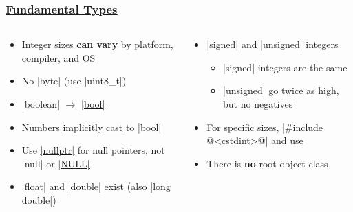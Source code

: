 \documentclass[glossy]{beamer}
\newcommand{\cppref}[2]{\href{http://en.cppreference.com/w/cpp/#1}{\underline{#2}}}
\begin{document}

\begin{frame}[fragile=singleslide]
  \frametitle{\cppref{language/types}{Fundamental Types}}
  \begin{columns}[t]
    \begin{column}{6cm}
      \begin{itemize}
        \item Integer sizes \cppref{language/types\#Data_models}{\textbf{can vary}} by platform, compiler, and OS
        \item No \javainline|byte| (use \cppinline|uint8_t|)
        \item \javainline|boolean| $\rightarrow$ \cppref{language/types\#Boolean_type}{\cppinline|bool|}
        \item Numbers \cppref{language/implicit_cast}{implicitly cast} to \cppinline|bool|
        \item Use \cppref{language/nullptr}{\cppinline|nullptr|} for null pointers, not \javainline|null| or \cppref{types/NULL}{\cppinline|NULL|}
        \item \cppinline|float| and \cppinline|double| exist (also \cppinline|long double|)
      \end{itemize}
    \end{column}

    \begin{column}{6cm}
      \begin{itemize}
        \item \cppinline|signed| and \cppinline|unsigned| integers
        \begin{itemize}
          \item \cppinline|signed| integers are the same
          \item \cppinline|unsigned| go twice as high, but no negatives
        \end{itemize}
        \item For specific sizes, \cppinline|#include @\cppref{preprocessor/include}{<cstdint>}@| and use 
        \item There is \textbf{no} root object class
      \end{itemize}
    \end{column}
  \end{columns}
\end{frame}

\end{document}
